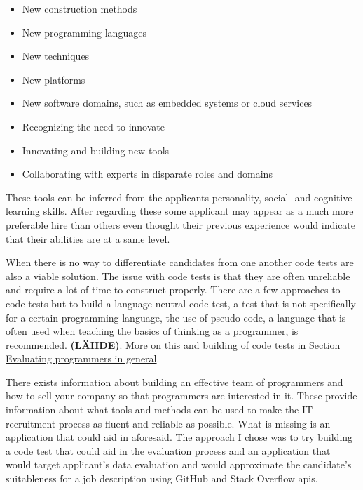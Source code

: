 \documentclass[11pt,a4paper,oneside,article]{memoir}
\begin{document}
\vspace{-17pt} 
\begin{itemize}
\item New construction methods
\item New programming languages
\item New techniques
\item New platforms
\item New software domains, such as embedded systems or cloud services
\item Recognizing the need to innovate
\item Innovating and building new tools
\item Collaborating with experts in disparate roles and domains
\end{itemize}
\vspace{-17pt} \cite[p.~10]{mcculler:book}

These tools can be inferred from the applicants personality, social- and cognitive learning skills. After regarding these some applicant may appear as a much more preferable hire than others even thought their previous experience would indicate that their abilities are at a same level.

When there is no way to differentiate candidates from one another code tests are also a viable solution. The issue with code tests is that they are often unreliable and require a lot of time to construct properly. There are a few approaches to code tests but to build a language neutral code test, a test that is not specifically for a certain programming language, the use of pseudo code, a language that is often used when teaching the basics of thinking as a programmer, is recommended. \textbf{(LÄHDE)}. More on this and building of code tests in Section \hyperref[sec:evaluating]{Evaluating programmers in general}.



There exists information about building an effective team of programmers and how to sell your company so that programmers are interested in it. These provide information about what tools and methods can be used to make the IT recruitment process as fluent and reliable as possible. What is missing is an application that could aid in aforesaid. The approach I chose was to try building a code test that could aid in the evaluation process and an application that would target applicant's data evaluation and would approximate the candidate's suitableness for a job description using GitHub and Stack Overflow \gls{api}s. 
\end{document}
